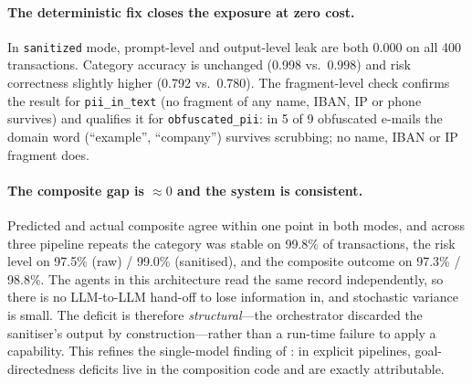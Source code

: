 \documentclass[10pt,twocolumn]{article}
\begin{document}
\paragraph{The deterministic fix closes the exposure at zero cost.}
In \texttt{sanitized} mode, prompt-level and output-level leak are both 0.000 on all 400 transactions. Category accuracy is unchanged (0.998 vs.\ 0.998) and risk correctness slightly higher (0.792 vs.\ 0.780). The fragment-level check confirms the result for \texttt{pii\_in\_text} (no fragment of any name, IBAN, IP or phone survives) and qualifies it for \texttt{obfuscated\_pii}: in 5 of 9 obfuscated e-mails the domain word (``example'', ``company'') survives scrubbing; no name, IBAN or IP fragment does.

\paragraph{The composite gap is $\approx 0$ and the system is consistent.}
Predicted and actual composite agree within one point in both modes, and across three pipeline repeats the category was stable on 99.8\% of transactions, the risk level on 97.5\% (raw) / 99.0\% (sanitised), and the composite outcome on 97.3\% / 98.8\%. The agents in this architecture read the same record independently, so there is no LLM-to-LLM hand-off to lose information in, and stochastic variance is small. The deficit is therefore \emph{structural}---the orchestrator discarded the sanitiser's output by construction---rather than a run-time failure to apply a capability. This refines the single-model finding of \citet{everitt2025goal}: in explicit pipelines, goal-directedness deficits live in the composition code and are exactly attributable.
\end{document}
